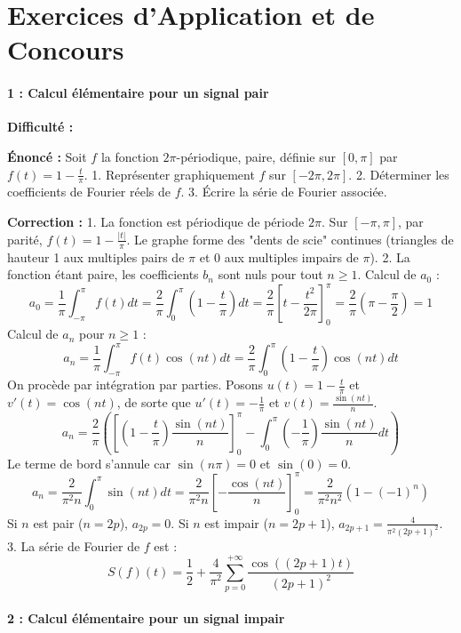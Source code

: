 \documentclass[12pt,a4paper]{article}
\begin{document}
\part{Exercices d'Application et de Concours}
\subsection*{1 : Calcul élémentaire pour un signal pair}

\textbf{Difficulté :} \bigstar\star\star\star\star

\textbf{Énoncé :}
Soit $f$ la fonction $2\pi$-périodique, paire, définie sur $[0, \pi]$ par $f(t) = 1 - \frac{t}{\pi}$.
1. Représenter graphiquement $f$ sur $[-2\pi, 2\pi]$.
2. Déterminer les coefficients de Fourier réels de $f$.
3. Écrire la série de Fourier associée.

\textbf{Correction :}
1. La fonction est périodique de période $2\pi$. Sur $[-\pi, \pi]$, par parité, $f(t) = 1 - \frac{|t|}{\pi}$. Le graphe forme des "dents de scie" continues (triangles de hauteur 1 aux multiples pairs de $\pi$ et 0 aux multiples impairs de $\pi$).
2. La fonction étant paire, les coefficients $b_n$ sont nuls pour tout $n \ge 1$.
   Calcul de $a_0$ :
   $$a_0 = \frac{1}{\pi} \int_{-\pi}^\pi f(t) dt = \frac{2}{\pi} \int_0^\pi \left(1 - \frac{t}{\pi}\right) dt = \frac{2}{\pi} \left[ t - \frac{t^2}{2\pi} \right]_0^\pi = \frac{2}{\pi} \left( \pi - \frac{\pi}{2} \right) = 1$$
   Calcul de $a_n$ pour $n \ge 1$ :
   $$a_n = \frac{1}{\pi} \int_{-\pi}^\pi f(t) \cos(nt) dt = \frac{2}{\pi} \int_0^\pi \left(1 - \frac{t}{\pi}\right) \cos(nt) dt$$
   On procède par intégration par parties. Posons $u(t) = 1 - \frac{t}{\pi}$ et $v'(t) = \cos(nt)$, de sorte que $u'(t) = -\frac{1}{\pi}$ et $v(t) = \frac{\sin(nt)}{n}$.
   $$a_n = \frac{2}{\pi} \left( \left[ \left(1 - \frac{t}{\pi}\right) \frac{\sin(nt)}{n} \right]_0^\pi - \int_0^\pi \left(-\frac{1}{\pi}\right) \frac{\sin(nt)}{n} dt \right)$$
   Le terme de bord s'annule car $\sin(n\pi) = 0$ et $\sin(0) = 0$.
   $$a_n = \frac{2}{\pi^2 n} \int_0^\pi \sin(nt) dt = \frac{2}{\pi^2 n} \left[ -\frac{\cos(nt)}{n} \right]_0^\pi = \frac{2}{\pi^2 n^2} (1 - (-1)^n)$$
   Si $n$ est pair ($n = 2p$), $a_{2p} = 0$.
   Si $n$ est impair ($n = 2p+1$), $a_{2p+1} = \frac{4}{\pi^2 (2p+1)^2}$.
3. La série de Fourier de $f$ est :
   $$S(f)(t) = \frac{1}{2} + \frac{4}{\pi^2} \sum_{p=0}^{+\infty} \frac{\cos((2p+1)t)}{(2p+1)^2}$$


\subsection*{2 : Calcul élémentaire pour un signal impair}
\end{document}
